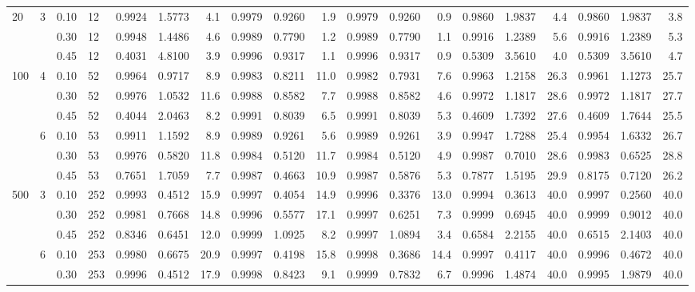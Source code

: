 \documentclass[thesis=B,english]{FITthesis}[2012/10/20]
\begin{document}
\begin{table}[h!]
\begin{adjustbox}{angle=90}
{\begin{tabular}{l|l|l|l|r|r|r|r|r|r|r|r|r|r|r|r|r|r|r|}
			20  & 3 & 0.10 & 12  &   0.9924 &  1.5773 &   4.1 &           0.9979 &  0.9260 &   1.9 &           0.9979 &  0.9260 &   0.9 &  0.9860 &  1.9837 &   4.4 &  0.9860 &  1.9837 &   3.8 \\    &   & 0.30 & 12  &   0.9948 &  1.4486 &   4.6 &           0.9989 &  0.7790 &   1.2 &           0.9989 &  0.7790 &   1.1 &  0.9916 &  1.2389 &   5.6 &  0.9916 &  1.2389 &   5.3 \\    &   & 0.45 & 12  &   0.4031 &  4.8100 &   3.9 &           0.9996 &  0.9317 &   1.1 &           0.9996 &  0.9317 &   0.9 &  0.5309 &  3.5610 &   4.0 &  0.5309 &  3.5610 &   4.7 \\100 & 4 & 0.10 & 52  &   0.9964 &  0.9717 &   8.9 &           0.9983 &  0.8211 &  11.0 &           0.9982 &  0.7931 &   7.6 &  0.9963 &  1.2158 &  26.3 &  0.9961 &  1.1273 &  25.7 \\    &   & 0.30 & 52  &   0.9976 &  1.0532 &  11.6 &           0.9988 &  0.8582 &   7.7 &           0.9988 &  0.8582 &   4.6 &  0.9972 &  1.1817 &  28.6 &  0.9972 &  1.1817 &  27.7 \\    &   & 0.45 & 52  &   0.4044 &  2.0463 &   8.2 &           0.9991 &  0.8039 &   6.5 &           0.9991 &  0.8039 &   5.3 &  0.4609 &  1.7392 &  27.6 &  0.4609 &  1.7644 &  25.5 \\    & 6 & 0.10 & 53  &   0.9911 &  1.1592 &   8.9 &           0.9989 &  0.9261 &   5.6 &           0.9989 &  0.9261 &   3.9 &  0.9947 &  1.7288 &  25.4 &  0.9954 &  1.6332 &  26.7 \\    &   & 0.30 & 53  &   0.9976 &  0.5820 &  11.8 &           0.9984 &  0.5120 &  11.7 &           0.9984 &  0.5120 &   4.9 &  0.9987 &  0.7010 &  28.6 &  0.9983 &  0.6525 &  28.8 \\    &   & 0.45 & 53  &   0.7651 &  1.7059 &   7.7 &           0.9987 &  0.4663 &  10.9 &           0.9987 &  0.5876 &   5.3 &  0.7877 &  1.5195 &  29.9 &  0.8175 &  0.7120 &  26.2 \\500 & 3 & 0.10 & 252 &   0.9993 &  0.4512 &  15.9 &           0.9997 &  0.4054 &  14.9 &           0.9996 &  0.3376 &  13.0 &  0.9994 &  0.3613 &  40.0 &  0.9997 &  0.2560 &  40.0 \\    &   & 0.30 & 252 &   0.9981 &  0.7668 &  14.8 &           0.9996 &  0.5577 &  17.1 &           0.9997 &  0.6251 &   7.3 &  0.9999 &  0.6945 &  40.0 &  0.9999 &  0.9012 &  40.0 \\    &   & 0.45 & 252 &   0.8346 &  0.6451 &  12.0 &           0.9999 &  1.0925 &   8.2 &           0.9997 &  1.0894 &   3.4 &  0.6584 &  2.2155 &  40.0 &  0.6515 &  2.1403 &  40.0 \\    & 6 & 0.10 & 253 &   0.9980 &  0.6675 &  20.9 &           0.9997 &  0.4198 &  15.8 &           0.9998 &  0.3686 &  14.4 &  0.9997 &  0.4117 &  40.0 &  0.9996 &  0.4672 &  40.0 \\    &   & 0.30 & 253 &   0.9996 &  0.4512 &  17.9 &           0.9998 &  0.8423 &   9.1 &           0.9999 &  0.7832 &   6.7 &  0.9996 &  1.4874 &  40.0 &  0.9995 &  1.9879 &  40.0 \\
			 \hline 
			\end{tabular} 
			
}
\end{adjustbox}
\end{table}
\end{document}
